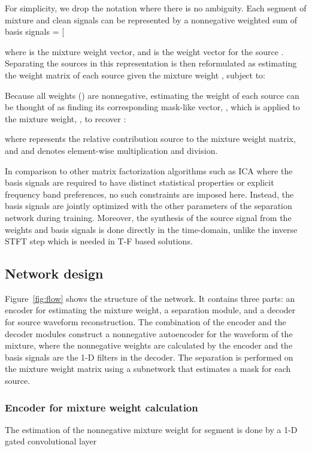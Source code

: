\documentclass{article}
\renewcommand{\vec}[1]{\bm{\mathrm{#1}}}
\begin{document}
For simplicity, we drop the notation  where there is no ambiguity. Each segment of mixture and clean signals can be represented by a nonnegative weighted sum of  basis signals \vec{B} = [

where  is the mixture weight vector, and  is the weight vector for the source . Separating the sources in this representation is then reformulated as estimating the weight matrix of each source  given the mixture weight , subject to:


Because all weights () are nonnegative, estimating the weight of each source can be thought of as finding its corresponding mask-like vector, , which is applied to the mixture weight, , to recover :

where  represents the relative contribution source  to the mixture weight matrix, and  and  denotes element-wise multiplication and division. 

In comparison to other matrix factorization algorithms such as ICA where the basis signals are required to have distinct statistical properties or explicit frequency band preferences, no such constraints are imposed here. Instead, the basis signals are jointly optimized with the other parameters of the separation network during training. Moreover, the synthesis of the source signal from the weights and basis signals is done directly in the time-domain, unlike the inverse STFT step which is needed in T-F based solutions. 

\subsection{Network design}
Figure~\ref{fig:flow} shows the structure of the network. It contains three parts: an encoder for estimating the mixture weight, a separation module, and a decoder for source waveform reconstruction. The combination of the encoder and the decoder modules construct a nonnegative autoencoder for the waveform of the mixture, where the nonnegative weights are calculated by the encoder and the basis signals are the 1-D filters in the decoder. The separation is performed on the mixture weight matrix using a subnetwork that estimates a mask for each source.

\subsubsection{Encoder for mixture weight calculation}
\label{sec:mix}

The estimation of the nonnegative mixture weight  for segment  is done by a 1-D gated convolutional layer
\end{document}
